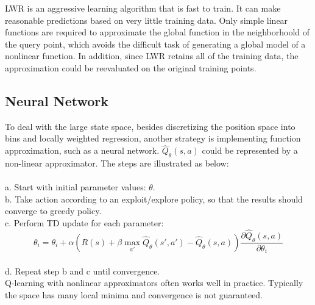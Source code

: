 \documentclass[11pt]{article}
\theoremstyle{definition}
\begin{document}
LWR is an aggressive learning algorithm that is fast to train. It can make reasonable predictions based on very little training data. Only simple linear functions are required to approximate the global function in the neighborhoold of the query point, which avoids the difficult task of generating a global model of a nonlinear function. In addition, since LWR retains all of the training data, the approximation could be reevaluated on the original training points.
 
\subsection{Neural Network}
To deal with the large state space, besides discretizing the position space into bins and locally weighted regression, another strategy is implementing function approximation, such as a neural network. $\hat{Q}_\theta(s,a)$ could be represented by a non-linear approximator. The steps are illustrated as below:\\
\\a. Start with initial parameter values: $\theta$.\\
  b. Take action according to an exploit/explore policy, so that the results should converge to greedy policy.\\
  c. Perform TD update for each parameter:
  $$\theta_i = \theta_i + \alpha(R(s) + \beta\max\limits_{a'}\hat{Q}_\theta(s', a')-\hat{Q}_\theta(s, a)) \dfrac{\partial {\hat{Q}_\theta(s, a)}}{\partial{\theta_i}}$$\\
  d. Repeat step b and c until convergence.\\
  
Q-learning with nonlinear approximators often works well in practice. Typically the space has many local minima and convergence is not guaranteed. 
 


\newpage
\end{document}
